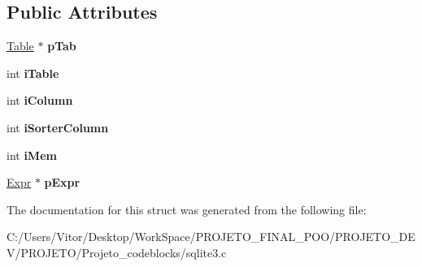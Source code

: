 \subsection*{Public Attributes}
\begin{DoxyCompactItemize}
\item 
\hypertarget{struct_agg_info_1_1_agg_info__col_ad2f2ae137b49e72d28a57accc9d06386}{\hyperlink{struct_table}{Table} $\ast$ {\bfseries p\-Tab}}\label{struct_agg_info_1_1_agg_info__col_ad2f2ae137b49e72d28a57accc9d06386}

\item 
\hypertarget{struct_agg_info_1_1_agg_info__col_ab49aa2fbfc6278c86b64497a6807c113}{int {\bfseries i\-Table}}\label{struct_agg_info_1_1_agg_info__col_ab49aa2fbfc6278c86b64497a6807c113}

\item 
\hypertarget{struct_agg_info_1_1_agg_info__col_a4cad2ce99ddf7425d358d49e40524f6b}{int {\bfseries i\-Column}}\label{struct_agg_info_1_1_agg_info__col_a4cad2ce99ddf7425d358d49e40524f6b}

\item 
\hypertarget{struct_agg_info_1_1_agg_info__col_ae3901ad0d5b6d519a7559358f1f7248b}{int {\bfseries i\-Sorter\-Column}}\label{struct_agg_info_1_1_agg_info__col_ae3901ad0d5b6d519a7559358f1f7248b}

\item 
\hypertarget{struct_agg_info_1_1_agg_info__col_ae22f3dfc6f9c2dc647be1b9fbd14e896}{int {\bfseries i\-Mem}}\label{struct_agg_info_1_1_agg_info__col_ae22f3dfc6f9c2dc647be1b9fbd14e896}

\item 
\hypertarget{struct_agg_info_1_1_agg_info__col_a60f23ec0abfcc88cab7083967a3abd9e}{\hyperlink{struct_expr}{Expr} $\ast$ {\bfseries p\-Expr}}\label{struct_agg_info_1_1_agg_info__col_a60f23ec0abfcc88cab7083967a3abd9e}

\end{DoxyCompactItemize}


The documentation for this struct was generated from the following file\-:\begin{DoxyCompactItemize}
\item 
C\-:/\-Users/\-Vitor/\-Desktop/\-Work\-Space/\-P\-R\-O\-J\-E\-T\-O\-\_\-\-F\-I\-N\-A\-L\-\_\-\-P\-O\-O/\-P\-R\-O\-J\-E\-T\-O\-\_\-\-D\-E\-V/\-P\-R\-O\-J\-E\-T\-O/\-Projeto\-\_\-codeblocks/sqlite3.\-c\end{DoxyCompactItemize}
